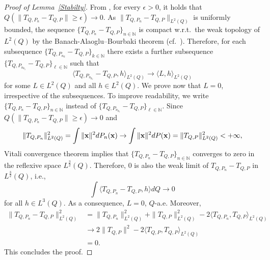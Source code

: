 \documentclass{imsart}
\numberwithin{equation}{section}
\def\N{\mathbb{N}}
\def\x{\mathbf{x}}
\def\N{\mathbb N}
\def\x{\mathbf x}
\begin{document}
\begin{proof}[Proof of Lemma~\ref{Stabilty}]
	
	From \cite[Corollary~5.23]{villani2008optimal},
	for every $\epsilon>0$, it holds that 
	$Q(\| T_{Q,P_n} - T_{Q,P}\| \geq \epsilon) \to 0$. As $\| T_{Q,P_n} - T_{Q,P}\|_{L^2(Q)}$ is uniformly bounded, the sequence   $\{ T_{Q,P_n} - T_{Q,P}\}_{n\in \N}$ is compact w.r.t.\ the weak topology of $L^2(Q)$ by the Banach-Alaoglu–Bourbaki theorem (cf.\ \cite[Theorem~3.16]{Brezis}). Therefore, for each subsequence $\{ T_{Q,P_{n_k}} - T_{Q,P}\}_{k\in \N}$  there exists a further subsequence $\{ T_{Q,P_{n_{k_\ell}}} - T_{Q,P}\}_{\ell\in \N}$ such that 
	$$ \langle T_{Q,P_{n_{k_\ell}}} - T_{Q,P},h \rangle_{L^2(Q)}\to  \langle  L,h \rangle_{L^2(Q)}$$
	for some $L\in L^2(Q)$ and all $h\in L^2(Q)$. We prove now that $L=0$, irrespective of the subsequences. To improve readability, we write $\{ T_{Q,P_n} - T_{Q,P}\}_{n\in \N}$ instead of $\{ T_{Q,P_{n_{k_\ell}}} - T_{Q,P}\}_{\ell\in \N}$.   
	Since $Q(\| T_{Q,P_n} - T_{Q,P} \| \geq \epsilon) \to 0 $ and $$\|T_{Q,P_n}\|_{L^2(Q)}^2=\int \|\x\|^2 {\rm d} P_n(\x) \to  \int \|\x\|^2 {\rm d} P(\x)=\|T_{Q,P}\|^2_{L^2(Q)}<+\infty,$$ 
	Vitali convergence theorem implies that $\{ T_{Q,P_{n}} - T_{Q,P}\}_{n\in \N}$ converges to zero in the reflexive space  $L^{\frac{3}{2}}(Q)$.  Therefore,
	$0$ is also the weak limit of $ T_{Q,P_n} - T_{Q,P}$ in $L^{\frac{3}{2}}(Q)$, i.e., 
	$$ \int \langle T_{Q,P_{n}} - T_{Q,P},h \rangle dQ \to  0 $$
	for all $h\in L^{3}(Q)$. As a consequence, $L=0$,  $Q$-a.e. Moreover, 
	\begin{align*}
		\| T_{Q,P_{n}} - T_{Q,P}\|_{L^{2}(Q)}^2
		& =  \|T_{Q,P_{n}}\|_{L^{2}(Q)}^2 + \|T_{Q,P}\|_{L^{2}(Q)}^2-2 \langle T_{Q,P_{n}} , T_{Q,P}\rangle_{L^{2}(Q)}
		\\ 
		& \to  2\|T_{Q,P}\|^2-2 \langle T_{Q,P} , T_{Q,P}\rangle_{L^{2}(Q)}
		\\
		& = 0. 
	\end{align*}
	This concludes the proof.
\end{proof}
\end{document}
